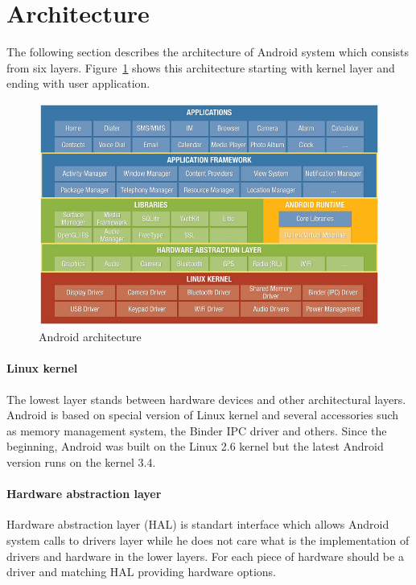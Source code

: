 \section{Architecture}\label{AndroidArchitecture}
The following section describes the architecture of Android system which consists from six layers. Figure~\ref{androidArchitecture} shows this architecture starting with kernel layer and ending with user application.
\\
\begin{figure}[h!]
    \centering
    \includegraphics[scale=0.55]{fig/android_architecture.jpg}
    \caption{Android architecture \cite{AndroidArch}}
    \label{androidArchitecture}
\end{figure}

\paragraph{Linux kernel}
The lowest layer stands between hardware devices and other architectural layers. Android is based on special version of Linux kernel and several accessories such as memory management system, the Binder IPC driver and others. Since the beginning, Android was built on the Linux 2.6 kernel but the latest Android version runs on the kernel 3.4.

\paragraph{Hardware abstraction layer}
Hardware abstraction layer (HAL) is standart interface which allows Android system calls to drivers layer while he does not care what is the implementation of drivers and hardware in the lower layers. For each piece of hardware should be a driver and matching HAL providing hardware options.

